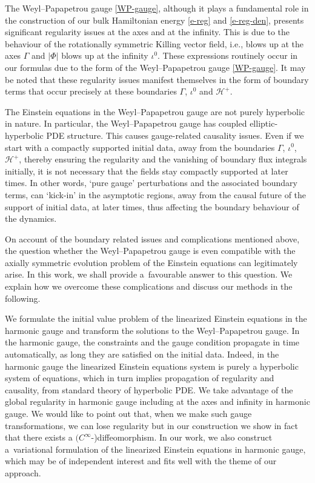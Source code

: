 \documentclass[11pt]{article}
\numberwithin{equation}{section}
\numberwithin{equation}{section}
\begin{document}
The Weyl--Papapetrou gauge \eqref{WP-gauge}, although it plays a fundamental role in the construction of our bulk Hamiltonian energy \eqref{e-reg} and \eqref{e-reg-den}, presents significant regularity issues at the axes and at the infinity. This is due to the behaviour of the rotationally symmetric Killing vector field, i.e.,  blows up at the axes $\Gamma$ and $\vert \Phi \vert$ blows up at the infinity $\iota^0$. These expressions routinely occur in our formulas due to the form of the Weyl--Papapetrou gauge \eqref{WP-gauge}. It may be noted that these regularity issues manifest themselves in the form of boundary terms that occur precisely at these boundaries $\Gamma$, $\iota^0$ and $\mathcal{H}^+$.

The Einstein equations in the Weyl--Papapetrou gauge are not purely hyperbolic in nature. In particular, the Weyl--Papapetrou gauge has coupled elliptic-hyperbolic PDE structure. This causes gauge-related causality issues. Even if we start with a compactly supported initial data, away from the boundaries $\Gamma$, $\iota^0$, $\mathcal{H}^+$, thereby ensuring the regularity and the vanishing of boundary flux integrals initially, it is not necessary that the fields stay compactly supported at later times. In other words, `pure gauge' perturbations and the associated boundary terms, can `kick-in' in the asymptotic regions, away from the causal future of the support of initial data, at later times, thus affecting the boundary behaviour of the dynamics.



On account of the boundary related issues and complications mentioned above, the question whether the Weyl--Papapetrou gauge is even compatible with the axially symmetric evolution problem of the Einstein equations can legitimately arise. In this work, we shall provide a~favourable answer to this question. We explain how we overcome these complications and discuss our methods in the following.

We formulate the initial value problem of the linearized Einstein equations in the harmonic gauge and transform the solutions to the Weyl--Papapetrou gauge. In the harmonic gauge, the constraints and the gauge condition propagate in time automatically, as long they are satisfied on the initial data. Indeed, in the harmonic gauge the linearized Einstein equations system is purely a hyperbolic system of equations, which in turn implies propagation of regularity and causality, from standard theory of hyperbolic PDE. We take advantage of the global regularity in harmonic gauge including at the axes and infinity in harmonic gauge. We would like to point out that, when we make such gauge transformations, we can lose regularity but in our construction we show in fact that there exists a $(C^\infty$-)diffeomorphism.
 In our work, we also construct a~variational formulation of the linearized Einstein equations in harmonic gauge, which may be of independent interest and fits well with the theme of our approach.
\end{document}
